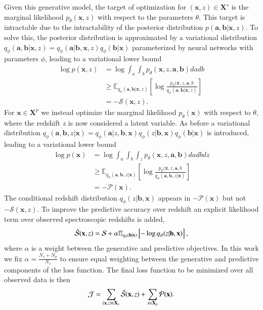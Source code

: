 Given this generative model, the target of optimization for $(\mathbf{x},z)\in \mathbf{X}^s$ is the marginal likelihood $p_\theta(\mathbf{x},z)$ with respect to the parameters $\theta$. This target is intractable due to the intractability of the posterior distribution $p(\mathbf{a},\mathbf{b}|\mathbf{x},z)$. To solve this, the posterior distribution is approximated by a variational distribution $q_\phi(\mathbf{a},\mathbf{b}|\mathbf{x},z)=q_\phi(\mathbf{a}|\mathbf{b},\mathbf{x},z) q_\phi(\mathbf{b}|\mathbf{x})$ parameterized by neural networks with parameters $\phi$, leading to a variational lower bound \citep{maaloeAuxiliaryDeepGenerative2016}
\begin{align}
    \log p(\mathbf{x},z) &= \log \int_a \int_b p_\theta (\mathbf{x},z,\mathbf{a},\mathbf{b}) dadb \\
    &\geq \mathbb{E}_{q_\phi(\mathbf{a},\mathbf{b}|\mathbf{x},z)} \left[ \log \frac{p_\theta(\mathbf{x},z,\mathbf{a},b}{q_\phi(\mathbf{a},\mathbf{b}|\mathbf{x},z)} \right] \\
    &= -\mathcal{S}(\mathbf{x},z). \label{eq:spec_loss}
\end{align}
For $\mathbf{x} \in \mathbf{X}^p$ we instead optimize the marginal likelihood $p_\theta(\mathbf{x})$ with respect to $\theta$, where the redshift $z$ is now considered a latent variable. As before a variational distribution $q_\phi(\mathbf{a},\mathbf{b},z|\mathbf{x})=q_\phi(\mathbf{a}|z,\mathbf{b},\mathbf{x})q_\phi(z|\mathbf{b},\mathbf{x})q_\phi(\mathbf{b}|\mathbf{x})$ is introduced, leading to a variational lower bound
\begin{align}
    \log p(\mathbf{x}) &= \log \int_a \int_b \int_z p_\theta (\mathbf{x},z,\mathbf{a},\mathbf{b}) dadbdz \\
    &\geq \mathbb{E}_{q_\phi(\mathbf{a},\mathbf{b},z|\mathbf{x})} \left[ \log \frac{p_\theta(\mathbf{x},z,\mathbf{a},b}{q_\phi(\mathbf{a},\mathbf{b},z|\mathbf{x})} \right] \\
    &= -\mathcal{P}(\mathbf{x}). \label{eq:phot_loss}
\end{align}
The conditional redshift distribution $q_\phi(z|\mathbf{b},\mathbf{x})$ appears in $-\mathcal{P}(\mathbf{x})$ but not $-\mathcal{S}(\mathbf{x},z)$. To improve the predictive accuracy over redshift an explicit likelihood term over observed spectroscopic redshifts is added,
\begin{align}
    \Tilde{\mathcal{S}}(\mathbf{x},z) = \mathcal{S} + \alpha \mathbb{E}_{q_\phi(\mathbf{b}|\mathbf{x})}\left[ -\log q_\phi(z|\mathbf{b},\mathbf{x}) \right], \label{eq:predictive_loss}
\end{align}
where $\alpha$ is a weight between the generative and predictive objectives. In this work we fix $\alpha=\frac{N_s+N_p}{N_s}$ to ensure equal weighting between the generative and predictive components of the loss function. The final loss function to be minimized over all observed data is then
\begin{align}
    \mathcal{J} = \sum_{(\mathbf{x},z)\in\mathbf{X}_s} \Tilde{\mathcal{S}}(\mathbf{x},z) + \sum_{x\in\mathbf{X}_p} \mathcal{P}(\mathbf{x}). \label{eq:loss}
\end{align}


